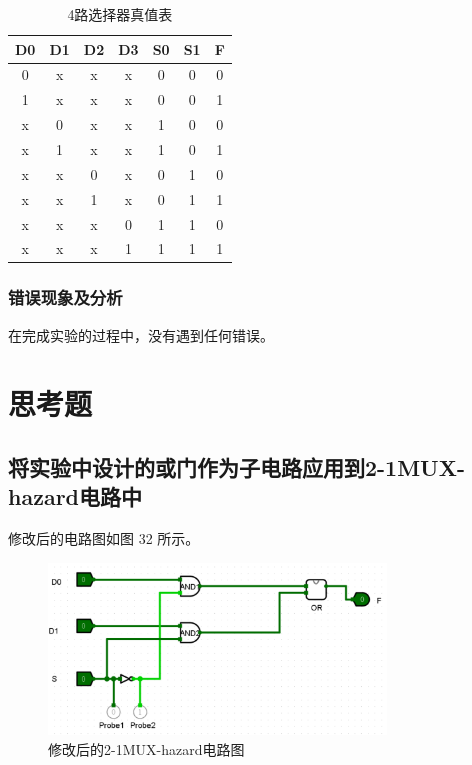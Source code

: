 \documentclass{article}
\begin{document}
    \begin{table}[H]
    \centering
    \begin{tabular}{|c c c c|c c|c|}
        \hline
        D0 & D1 & D2 & D3 & S0 & S1 & F \\ \hline
        0 & x & x & x & 0 & 0 & 0 \\ \hline
        1 & x & x & x & 0 & 0 & 1 \\ \hline
        x & 0 & x & x & 1 & 0 & 0 \\ \hline
        x & 1 & x & x & 1 & 0 & 1 \\ \hline
        x & x & 0 & x & 0 & 1 & 0 \\ \hline
        x & x & 1 & x & 0 & 1 & 1 \\ \hline
        x & x & x & 0 & 1 & 1 & 0 \\ \hline
        x & x & x & 1 & 1 & 1 & 1 \\ \hline
    \end{tabular}
    \caption{4路选择器真值表}
    \end{table}

    \subsubsection{错误现象及分析}
    在完成实验的过程中，没有遇到任何错误。


    \section{思考题}

    \subsection{将实验中设计的或门作为子电路应用到2-1MUX-hazard电路中}
    修改后的电路图如图 32 所示。
    \begin{figure}[H]
    \centering
    \includegraphics[width=0.8\textwidth]{8.1.png}
    \caption{修改后的2-1MUX-hazard电路图}
    \end{figure}
\end{document}
